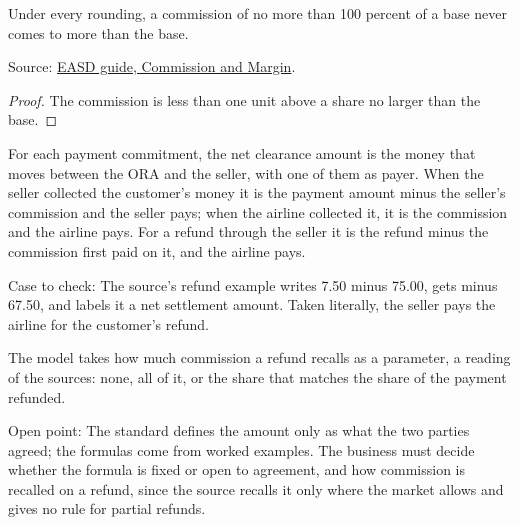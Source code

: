 \begin{theorem}
  \label{thm:accounting-percentage-within-base}
  Under every rounding, a commission of no more than 100 percent of a base
  never comes to more than the base.

  Source: \href{https://standards.atlassian.net/wiki/spaces/EASD/pages/574849050}{EASD guide, Commission and Margin}.
\end{theorem}
\begin{proof}
  The commission is less than one unit above a share no larger than the
  base.
\end{proof}

\begin{definition}
  \label{def:accounting-net-clearance-amount}
  For each payment commitment, the net clearance amount is the money that
  moves between the ORA and the seller, with one of them as payer. When the
  seller collected the customer's money it is the payment amount minus the
  seller's commission and the seller pays; when the airline collected it, it
  is the commission and the airline pays. For a refund through the seller it
  is the refund minus the commission first paid on it, and the airline pays.

  Case to check: The source's refund example writes 7.50 minus 75.00, gets
  minus 67.50, and labels it a net settlement amount. Taken literally, the
  seller pays the airline for the customer's refund.

  The model takes how much commission a refund recalls as a parameter, a
  reading of the sources: none, all of it, or the share that matches the
  share of the payment refunded.

  Open point: The standard defines the amount only as what the two parties
  agreed; the formulas come from worked examples. The business must decide
  whether the formula is fixed or open to agreement, and how commission is
  recalled on a refund, since the source recalls it only where the market
  allows and gives no rule for partial refunds.


\end{definition}
